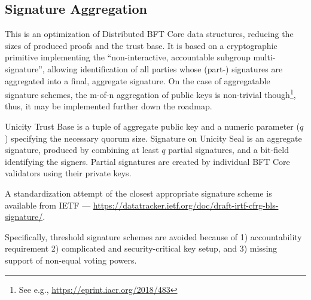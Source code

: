 \subsection{Signature Aggregation}

This is an optimization of Distributed BFT Core data structures, reducing the sizes of produced proofs and the trust base. It is based on a cryptographic primitive implementing the ``non-interactive, accountable subgroup multi-signature'', allowing identification of all parties whose (part-) signatures are aggregated into a final, aggregate signature. On the case of aggregatable signature schemes, the m-of-n aggregation of public keys is non-trivial though\footnote{See e.g., \url{https://eprint.iacr.org/2018/483}}, thus, it may be implemented further down the roadmap.

Unicity Trust Base is a tuple of aggregate public key and a numeric parameter ($q$) specifying the necessary quorum size. Signature on Unicity Seal is an aggregate signature, produced by combining at least $q$ partial signatures, and a bit-field identifying the signers. Partial signatures are created by individual BFT Core validators using their private keys.

A standardization attempt of the closest appropriate signature scheme is available from IETF --- \url{https://datatracker.ietf.org/doc/draft-irtf-cfrg-bls-signature/}.

Specifically, threshold signature schemes are avoided because of 1) accountability requirement 2) complicated and security-critical key setup, and 3) missing support of non-equal voting powers.
